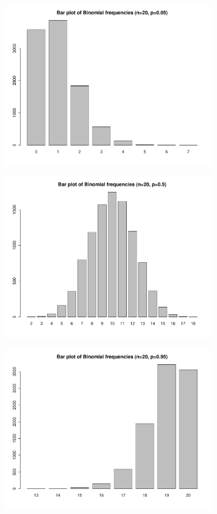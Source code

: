 \begin{frame}
  \begin{center}
 \includegraphics[width=9cm]{./../images/binomialn20p05.pdf}
\end{center}

\end{frame}

\begin{frame}
  \begin{center}
 \includegraphics[width=9cm]{./../images/binomialn20p5.pdf}
\end{center}

\end{frame}

\begin{frame}
  \begin{center}
 \includegraphics[width=9cm]{./../images/binomialn20p95.pdf}
\end{center}

\end{frame}

